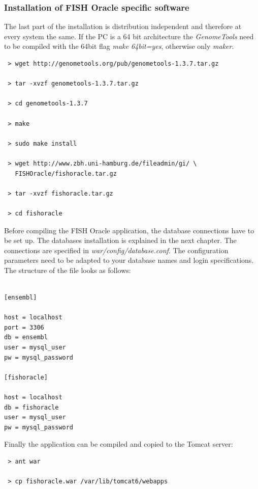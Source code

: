 \documentclass[11pt,final]{article}
\newcommand{\Gt}[0]{\emph{GenomeTools}\xspace}
\begin{document}

\subsubsection{Installation of FISH Oracle specific software}

The last part of the installation is distribution independent
and therefore at every system the same. If the PC is a 64 bit
architecture the \Gt need to be compiled with the 64bit
flag \textit{make 64bit=yes}, otherwise only \textit{maker}.

\begin{lstlisting}
 > wget http://genometools.org/pub/genometools-1.3.7.tar.gz

 > tar -xvzf genometools-1.3.7.tar.gz

 > cd genometools-1.3.7

 > make

 > sudo make install

 > wget http://www.zbh.uni-hamburg.de/fileadmin/gi/ \
   FISHOracle/fishoracle.tar.gz

 > tar -xvzf fishoracle.tar.gz

 > cd fishoracle
\end{lstlisting}

Before compiling the FISH Oracle application, the database connections have 
to be set up. The databases installation is explained in the next chapter.
The connections are specified in 
\textit{war/config/database.conf}. The configuration parameters need to be 
adapted to your database names and login specifications. The structure of the
file looks as follows:

\begin{verbatim}

[ensembl]

host = localhost
port = 3306
db = ensembl
user = mysql_user
pw = mysql_password

[fishoracle]

host = localhost
db = fishoracle
user = mysql_user
pw = mysql_password

\end{verbatim}

Finally the application can be compiled and copied to the Tomcat server:

\begin{lstlisting}
 > ant war 

 > cp fishoracle.war /var/lib/tomcat6/webapps
\end{lstlisting}
\end{document}
